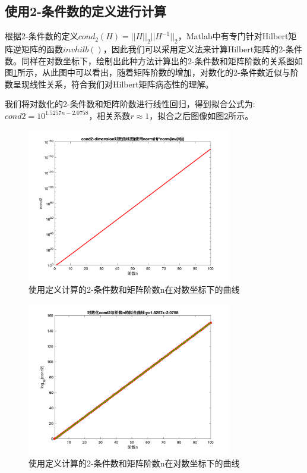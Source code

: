 \documentclass[a4paper]{article}
\begin{document}
\subsection{使用2-条件数的定义进行计算}
根据2-条件数的定义$cond_2(H)=||H||_2||H^{-1}||_2$，Matlab中有专门针对Hilbert矩阵逆矩阵的函数$invhilb()$，因此我们可以采用定义法来计算Hilbert矩阵的2-条件数。同样在对数坐标下，绘制出此种方法计算出的2-条件数和矩阵阶数的关系图如图\ref{fig:2}所示，从此图中可以看出，随着矩阵阶数的增加，对数化的2-条件数近似与阶数呈现线性关系，符合我们对Hilbert矩阵病态性的理解。

我们将对数化的2-条件数和矩阵阶数进行线性回归，得到拟合公式为: $cond2=10^{1.5257n-2.0758}$，相关系数$r\approx 1$，拟合之后图像如图\ref{fig:3}所示。

\begin{figure}[!h]
	\centering
	\includegraphics[width=0.8\textwidth]{../code/result/alogcond2}
	\caption{\label{fig:2}使用定义计算的2-条件数和矩阵阶数n在对数坐标下的曲线}
\end{figure}

\begin{figure}[!h]
	\centering
	\includegraphics[width=0.8\textwidth]{../code/result/cond2fit}
	\caption{\label{fig:3}使用定义计算的2-条件数和矩阵阶数n在对数坐标下的曲线}
\end{figure}
\end{document}
